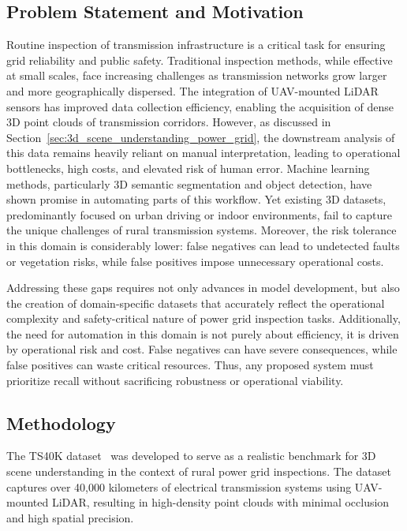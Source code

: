 \subsection{Problem Statement and Motivation}

Routine inspection of transmission infrastructure is a critical task for
ensuring grid reliability and public safety. Traditional inspection methods,
while effective at small scales, face increasing challenges as transmission
networks grow larger and more geographically dispersed. The integration of
UAV-mounted LiDAR sensors has improved data collection efficiency, enabling the
acquisition of dense 3D point clouds of transmission corridors. However, as
discussed in Section~\ref{sec:3d_scene_understanding_power_grid}, the
downstream analysis of this data remains heavily reliant on manual
interpretation, leading to operational bottlenecks, high costs, and elevated
risk of human error.
%
Machine learning methods, particularly 3D semantic segmentation and object
detection, have shown promise in automating parts of this workflow. Yet
existing 3D datasets, predominantly focused on urban driving or indoor
environments, fail to capture the unique challenges of rural transmission
systems. Moreover, the risk tolerance in this domain is considerably lower:
false negatives can lead to undetected faults or vegetation risks, while false
positives impose unnecessary operational costs.

Addressing these gaps requires not only advances in model development, but also
the creation of domain-specific datasets that accurately reflect the
operational complexity and safety-critical nature of power grid inspection
tasks.
%
Additionally, the need for automation in this domain is not purely about
efficiency, it is driven by operational risk and cost. False negatives can have
severe consequences, while false positives can waste critical resources. Thus,
any proposed system must prioritize recall without sacrificing robustness or
operational viability.

\subsection{Methodology}

The TS40K dataset~\cite{Lavado_2025_WACV} was developed to serve as a realistic
benchmark for 3D scene understanding in the context of rural power grid
inspections. The dataset captures over 40,000 kilometers of electrical
transmission systems using UAV-mounted LiDAR, resulting in high-density point
clouds with minimal occlusion and high spatial precision.

